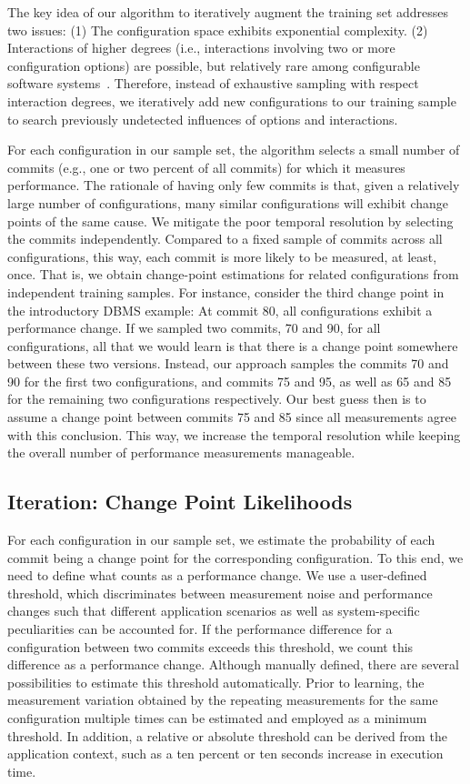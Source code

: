 \documentclass[sigconf]{acmart}
\begin{document}
	The key idea of our algorithm to iteratively augment the training set addresses two issues: (1) The configuration space exhibits exponential complexity. 
	(2) Interactions of higher degrees (i.e., interactions involving two or more configuration options) are possible, but relatively rare among configurable software systems~\cite{kolesnikov_relation_2019,kolesnikov_tradeoffs_2019}. Therefore, instead of exhaustive sampling with respect interaction degrees, we iteratively add new configurations to our training sample to search previously undetected influences of options and interactions.
	
	For each configuration in our sample set, the algorithm selects a small number of commits (e.g., one or two percent of all commits) for which it measures performance. 
	The rationale of having only few commits is that, given a relatively large number of configurations, many similar configurations will exhibit change points of the same cause. 
	We mitigate the poor temporal resolution by selecting the commits independently. 
	Compared to a fixed sample of commits across all configurations, this way, each commit is more likely to be measured, at least, once. That is, we obtain change-point estimations for related configurations from independent training samples. 
	For instance, consider the third change point in the introductory DBMS example: 
	At commit 80, all configurations exhibit a performance change. If we sampled two commits, 70 and 90, for all configurations, all that we would learn is that there is a change point somewhere between these two versions. 
	Instead, our approach samples the commits 70 and 90 for the first two configurations, and commits 75 and 95, as well as 65 and 85 for the remaining two configurations respectively. 
	Our best guess then is to assume a change point between commits 75 and 85 since all measurements agree with this conclusion. 
	This way, we increase the temporal resolution while keeping the overall number of performance measurements manageable.
	
	\subsection{Iteration: Change Point Likelihoods}\label{sec:changepointlikelihood}
	For each configuration in our sample set, we estimate the probability of each commit being a change point for the corresponding configuration.
	To this end, we need to define what counts as a performance change. We use a user-defined threshold, which discriminates between measurement noise and performance changes such that different application scenarios as well as system-specific peculiarities can be accounted for.
	If the performance difference for a configuration between two commits exceeds this threshold, we count this difference  as a performance change.
	Although manually defined, there are several possibilities to estimate this threshold automatically.
	Prior to learning, the measurement variation obtained by the repeating measurements for the same configuration multiple times can be estimated and employed as a minimum threshold.
	In addition, a relative or absolute threshold can be derived from the application context, such as a ten percent or ten seconds increase in execution time.
	
\end{document}
